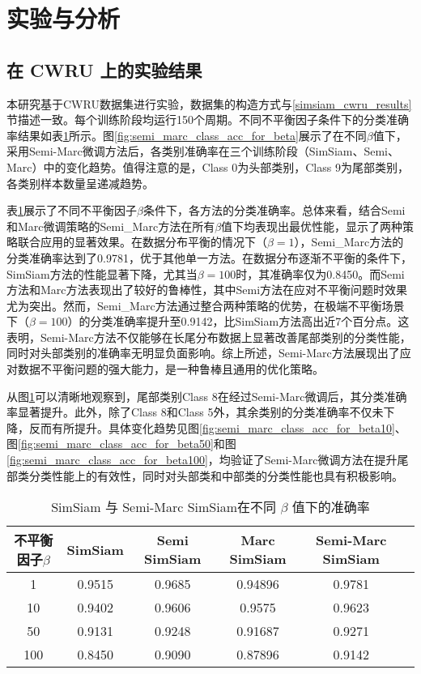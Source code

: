 \documentclass[master]{thesis-uestc}
\begin{document}
\section{实验与分析}

\subsection{在 CWRU 上的实验结果}
本研究基于CWRU数据集进行实验，数据集的构造方式与\ref{simsiam_cwru_results}节描述一致。每个训练阶段均运行150个周期。不同不平衡因子条件下的分类准确率结果如表\ref{simsiam_semi_results}所示。图\ref{fig:semi_marc_class_acc_for_beta}展示了在不同$\beta$值下，采用Semi-Marc微调方法后，各类别准确率在三个训练阶段（SimSiam、Semi、Marc）中的变化趋势。值得注意的是，Class 0为头部类别，Class 9为尾部类别，各类别样本数量呈递减趋势。

表\ref{simsiam_semi_results}展示了不同不平衡因子$\beta$条件下，各方法的分类准确率。总体来看，结合Semi和Marc微调策略的Semi\_Marc方法在所有$\beta$值下均表现出最优性能，显示了两种策略联合应用的显著效果。在数据分布平衡的情况下（$\beta=1$），Semi\_Marc方法的分类准确率达到了0.9781，优于其他单一方法。在数据分布逐渐不平衡的条件下，SimSiam方法的性能显著下降，尤其当$\beta=100$时，其准确率仅为0.8450。而Semi方法和Marc方法表现出了较好的鲁棒性，其中Semi方法在应对不平衡问题时效果尤为突出。然而，Semi\_Marc方法通过整合两种策略的优势，在极端不平衡场景下（$\beta=100$）的分类准确率提升至0.9142，比SimSiam方法高出近7个百分点。这表明，Semi-Marc方法不仅能够在长尾分布数据上显著改善尾部类别的分类性能，同时对头部类别的准确率无明显负面影响。综上所述，Semi-Marc方法展现出了应对数据不平衡问题的强大能力，是一种鲁棒且通用的优化策略。

从图\ref{simsiam_semi_results}可以清晰地观察到，尾部类别Class 8在经过Semi-Marc微调后，其分类准确率显著提升。此外，除了Class 8和Class 5外，其余类别的分类准确率不仅未下降，反而有所提升。具体变化趋势见图\ref{fig:semi_marc_class_acc_for_beta10}、图\ref{fig:semi_marc_class_acc_for_beta50}和图\ref{fig:semi_marc_class_acc_for_beta100}，均验证了Semi-Marc微调方法在提升尾部类分类性能上的有效性，同时对头部类和中部类的分类性能也具有积极影响。

\begin{table}[h]
    \caption{SimSiam 与 Semi-Marc SimSiam在不同 $\beta$ 值下的准确率}
    \centering
    \begin{tabular}{cccccc}
    \toprule
    不平衡因子$\beta$  & SimSiam & Semi SimSiam & Marc SimSiam& Semi-Marc SimSiam\\
    \midrule
    1   & 0.9515  & 0.9685 & 0.94896 & 0.9781 \\
    10  & 0.9402  & 0.9606 & 0.9575  & 0.9623 \\
    50  & 0.9131  & 0.9248 & 0.91687 & 0.9271 \\
    100 & 0.8450  & 0.9090 & 0.87896 & 0.9142 \\
    \bottomrule
    \end{tabular}
    \label{simsiam_semi_results}
\end{table}
\end{document}
